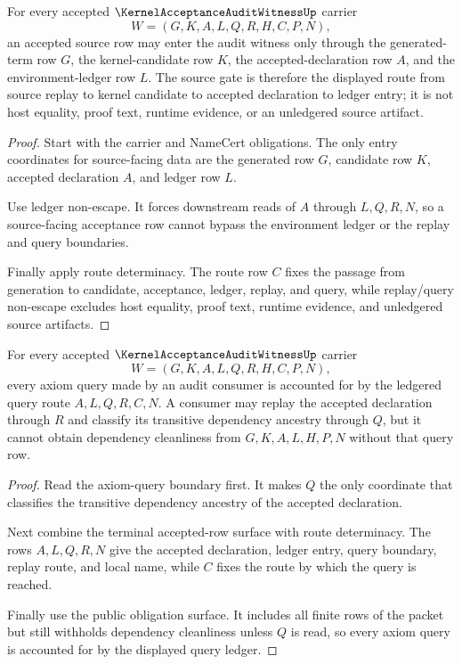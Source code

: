 \begin{theorem}
\label{thm:kernel-acceptance-audit-witness-source-gate}
For every accepted $\KernelAcceptanceAuditWitnessUp$ carrier
$$
W=(G,K,A,L,Q,R,H,C,P,N),
$$
an accepted source row may enter the audit witness only through the generated-term row $G$, the kernel-candidate row $K$, the accepted-declaration row $A$, and the environment-ledger row $L$. The source gate is therefore the displayed route from source replay to kernel candidate to accepted declaration to ledger entry; it is not host equality, proof text, runtime evidence, or an unledgered source artifact.
\end{theorem}
\begin{proof}
Start with the carrier and NameCert obligations. The only entry coordinates for source-facing data are the generated row $G$, candidate row $K$, accepted declaration $A$, and ledger row $L$.

Use ledger non-escape. It forces downstream reads of $A$ through $L,Q,R,N$, so a source-facing acceptance row cannot bypass the environment ledger or the replay and query boundaries.

Finally apply route determinacy. The route row $C$ fixes the passage from generation to candidate, acceptance, ledger, replay, and query, while replay/query non-escape excludes host equality, proof text, runtime evidence, and unledgered source artifacts.
\end{proof}

\begin{theorem}
\label{thm:kernel-acceptance-audit-witness-query-ledger-totality}
For every accepted $\KernelAcceptanceAuditWitnessUp$ carrier
$$
W=(G,K,A,L,Q,R,H,C,P,N),
$$
every axiom query made by an audit consumer is accounted for by the ledgered query route $A,L,Q,R,C,N$. A consumer may replay the accepted declaration through $R$ and classify its transitive dependency ancestry through $Q$, but it cannot obtain dependency cleanliness from $G,K,A,L,H,P,N$ without that query row.
\end{theorem}
\begin{proof}
Read the axiom-query boundary first. It makes $Q$ the only coordinate that classifies the transitive dependency ancestry of the accepted declaration.

Next combine the terminal accepted-row surface with route determinacy. The rows $A,L,Q,R,N$ give the accepted declaration, ledger entry, query boundary, replay route, and local name, while $C$ fixes the route by which the query is reached.

Finally use the public obligation surface. It includes all finite rows of the packet but still withholds dependency cleanliness unless $Q$ is read, so every axiom query is accounted for by the displayed query ledger.
\end{proof}

